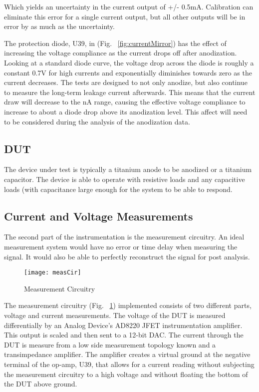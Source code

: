 Which yields an uncertainty in the current output of +/- 0.5mA. Calibration can eliminate this error for a single current output, but all other outputs will be in error by as much as the uncertainty.

The protection diode, U39, in (Fig. ~\ref{fig:currentMirror}) has the effect of increasing the voltage compliance as the current drops off after anodization. Looking at a standard diode curve, the voltage drop across the diode is roughly a constant 0.7V for high currents and exponentially diminishes towards zero as the current decreases. The tests are designed to not only anodize, but also continue to measure the long-term leakage current afterwards. This means that the current draw will decrease to the nA range, causing the effective voltage compliance to increase to about a diode drop above its anodization level. This affect will need to be considered during the analysis of the anodization data.

\subsection{DUT}
\label{DUT}

The device under test is typically a titanium anode to be anodized or a titanium capacitor. The device is able to operate with resistive loads and any capacitive loads (with capacitance large enough for the system to be able to respond.


\subsection{Current and Voltage Measurements}
\label{Current and Voltage Measurements}

The second part of the instrumentation is the measurement circuitry. An ideal measurement system would have no error or time delay when measuring the signal. It would also be able to perfectly reconstruct the signal for post analysis. 


\begin{figure}[here]
\centering
\texttt{[image: measCir]}
\caption{Measurement Circuitry}
\label{fig:measCir}
\end{figure}

The measurement circuitry (Fig. ~\ref{fig:measCir}) implemented consists of two different parts, voltage and current measurements. The voltage of the DUT is measured differentially by an Analog Device’s AD8220 JFET instrumentation amplifier. This output is scaled and then sent to a 12-bit DAC. The current through the DUT is measure from a low side measurement topology known and a transimpedance amplifier. The amplifier creates a virtual ground at the negative terminal of the op-amp, U39, that allows for a current reading without subjecting the measurement circuitry to a high voltage and without floating the bottom of the DUT above ground.

